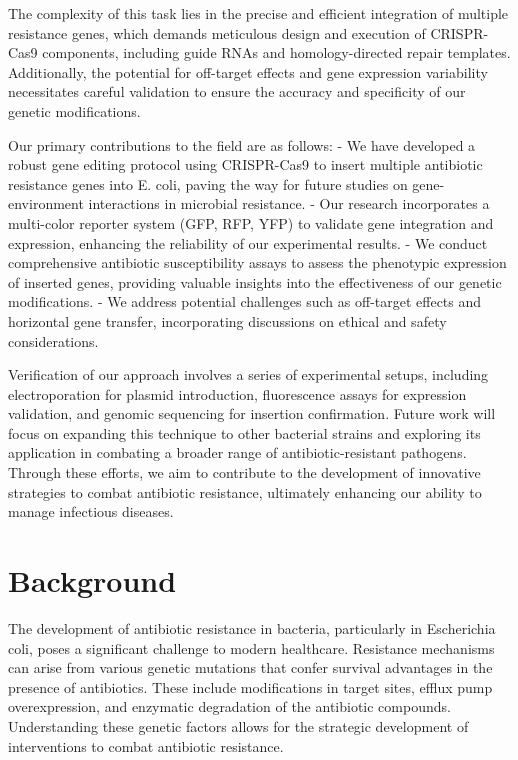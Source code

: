\documentclass{article}
\begin{document}
The complexity of this task lies in the precise and efficient integration of multiple resistance genes, which demands meticulous design and execution of CRISPR-Cas9 components, including guide RNAs and homology-directed repair templates. Additionally, the potential for off-target effects and gene expression variability necessitates careful validation to ensure the accuracy and specificity of our genetic modifications.

Our primary contributions to the field are as follows:
- We have developed a robust gene editing protocol using CRISPR-Cas9 to insert multiple antibiotic resistance genes into E. coli, paving the way for future studies on gene-environment interactions in microbial resistance.
- Our research incorporates a multi-color reporter system (GFP, RFP, YFP) to validate gene integration and expression, enhancing the reliability of our experimental results.
- We conduct comprehensive antibiotic susceptibility assays to assess the phenotypic expression of inserted genes, providing valuable insights into the effectiveness of our genetic modifications.
- We address potential challenges such as off-target effects and horizontal gene transfer, incorporating discussions on ethical and safety considerations.

Verification of our approach involves a series of experimental setups, including electroporation for plasmid introduction, fluorescence assays for expression validation, and genomic sequencing for insertion confirmation. Future work will focus on expanding this technique to other bacterial strains and exploring its application in combating a broader range of antibiotic-resistant pathogens. Through these efforts, we aim to contribute to the development of innovative strategies to combat antibiotic resistance, ultimately enhancing our ability to manage infectious diseases.

\section{Background}
The development of antibiotic resistance in bacteria, particularly in Escherichia coli, poses a significant challenge to modern healthcare. Resistance mechanisms can arise from various genetic mutations that confer survival advantages in the presence of antibiotics. These include modifications in target sites, efflux pump overexpression, and enzymatic degradation of the antibiotic compounds. Understanding these genetic factors allows for the strategic development of interventions to combat antibiotic resistance.
\end{document}
